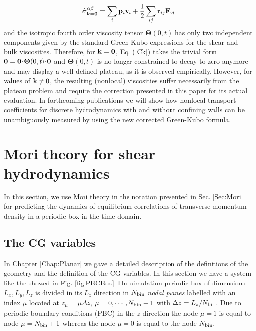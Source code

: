\documentclass[a4paper,openright,12pt]{book}
\newcommand{\esc}{\!\cdot\!}
\begin{document}
{\begin{align}
  \hat{\boldsymbol{\sigma}}^{\alpha\beta}_{{\bf k}={\bf 0}}=\sum_i{\bf p}_i{\bf v}_i+\frac{1}{2}\sum_{ij}{\bf r}_{ij}{\bf F}_{ ij}
\end{align}
and     the     isotropic     fourth    order     viscosity     tensor
$\boldsymbol{\Theta}(0,t)$ has  only two independent  components given
by  the  standard  Green-Kubo  expressions  for  the  shear  and  bulk
viscosities.  Therefore, for ${\bf  k}={\bf 0}$, Eq.  (\ref{Ck}) takes
the trivial form ${\bf 0}={\bf 0}\esc \boldsymbol{\Theta}(0,t)\esc{\bf
  0}$ and $\boldsymbol{\Theta}(0,t)$ is no longer constrained to decay
to  zero anymore  and may  display a  well-defined plateau,  as it  is
observed  empirically. However,  for values  of ${\bf  k}\neq 0$,  the
resulting (nonlocal) viscosities suffer  necessarily from the plateau
problem and  require the  correction presented in  this paper  for its
actual  evaluation.   In forthcoming  publications  we  will show  how
nonlocal transport  coefficients for discrete hydrodynamics  with and
without confining walls can be unambiguously measured by using the new
corrected Green-Kubo formula.
} %


\section{Mori theory for shear hydrodynamics}
\label{Sec:MoriPBC}
In this section, we use Mori theory in the notation presented in Sec. \ref{Sec:Mori} for predicting the dynamics of equilibrium correlations of transverse momentum density in a periodic box in the time domain. 
\subsection{The CG variables}
\label{Sec:CGVariablesPBC}
In Chapter \ref{Chap:Planar} we gave a detailed description of the definitions of the geometry and the definition of the CG variables. In this section we have a system like the showed in Fig. \ref{fig:PBCBox}
The simulation periodic box of  dimensions $L_x,L_y,L_z$ is divided in
its $L_z$  direction in  $N_{\rm bin}$ \textit{nodal  planes} labelled
with   an    index   $\mu$   located   at    $z_\mu=\mu   \Delta   z$,
$\mu=0,\cdots,N_{\rm bin}-1$ with $\Delta  z=L_z/N_{\rm bin}$.  Due to
periodic  boundary conditions  (PBC)  in the  $z$  direction the  node
$\mu=1$ is equal to node  $\mu=N_{\rm bin}+1$ whereas the node $\mu=0$
is equal to the node  $N_{\rm bin}$.  
\end{document}
